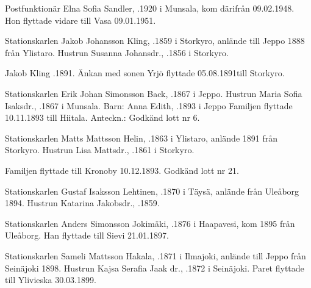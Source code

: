 Postfunktionär Elna Sofia Sandler, .1920 i Munsala, kom därifrån 09.02.1948. Hon flyttade vidare till Vasa 09.01.1951.

Stationskarlen Jakob Johansson Kling, .1859 i Storkyro, anlände till Jeppo 1888 från Ylistaro. Hustrun Susanna Johansdr., .1856 i Storkyro.
\begin{jhchildren}
  \item {}
  \item {}
\end{jhchildren}
Jakob Kling .1891. Änkan med sonen Yrjö flyttade 05.08.1891till Storkyro.


Stationskarlen Erik Johan Simonsson Back, .1867 i Jeppo. Hustrun Maria Sofia Isaksdr., .1867 i Munsala.
Barn: Anna Edith, .1893 i Jeppo
Familjen flyttade 10.11.1893 till Hiitala. Anteckn.: Godkänd lott nr 6.


Stationskarlen Matts Mattsson Helin, .1863 i Ylistaro, anlände 1891 från Storkyro. Hustrun Lisa Mattsdr., .1861 i Storkyro.
\begin{jhchildren}
  \item {}
  \item {}
\end{jhchildren}
Familjen flyttade till Kronoby 10.12.1893. Godkänd lott nr 21.


Stationskarlen Gustaf Isaksson Lehtinen, .1870 i Täysä, anlände från Uleåborg 1894. Hustrun Katarina Jakobsdr., .1859.
\begin{jhchildren}
  \item {}
  \item {}
\end{jhchildren}


Stationskarlen Anders Simonsson Jokimäki, .1876 i Haapavesi, kom 1895 från Uleåborg. Han flyttade till Sievi 21.01.1897.


Stationskarlen Sameli Mattsson Hakala, .1871 i Ilmajoki, anlände till Jeppo från Seinäjoki 1898. Hustrun Kajsa Serafia Jaak dr., .1872 i Seinäjoki. Paret flyttade till Ylivieska 30.03.1899.


